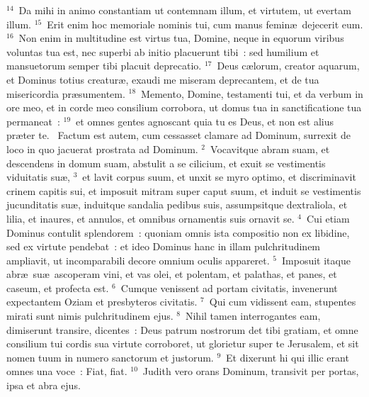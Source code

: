 ${}^{14}$~Da mihi in animo constantiam ut contemnam illum, et virtutem, ut evertam illum.
${}^{15}$~Erit enim hoc memoriale nominis tui, cum manus femin\ae\ dejecerit eum.
${}^{16}$~Non enim in multitudine est virtus tua, Domine, neque in equorum viribus voluntas tua est, nec superbi ab initio placuerunt tibi~: sed humilium et mansuetorum semper tibi placuit deprecatio.
${}^{17}$~Deus c\ae lorum, creator aquarum, et Dominus totius creatur\ae , exaudi me miseram deprecantem, et de tua misericordia pr\ae sumentem.
${}^{18}$~Memento, Domine, testamenti tui, et da verbum in ore meo, et in corde meo consilium corrobora, ut domus tua in sanctificatione tua permaneat~:
${}^{19}$~et omnes gentes agnoscant quia tu es Deus, et non est alius pr\ae ter te.
~Factum est autem, cum cessasset clamare ad Dominum, surrexit de loco in quo jacuerat prostrata ad Dominum.
${}^{2}$~Vocavitque abram suam, et descendens in domum suam, abstulit a se cilicium, et exuit se vestimentis viduitatis su\ae ,
${}^{3}$~et lavit corpus suum, et unxit se myro optimo, et discriminavit crinem capitis sui, et imposuit mitram super caput suum, et induit se vestimentis jucunditatis su\ae , induitque sandalia pedibus suis, assumpsitque dextraliola, et lilia, et inaures, et annulos, et omnibus ornamentis suis ornavit se.
${}^{4}$~Cui etiam Dominus contulit splendorem~: quoniam omnis ista compositio non ex libidine, sed ex virtute pendebat~: et ideo Dominus hanc in illam pulchritudinem ampliavit, ut incomparabili decore omnium oculis appareret.
${}^{5}$~Imposuit itaque abr\ae\ su\ae\ ascoperam vini, et vas olei, et polentam, et palathas, et panes, et caseum, et profecta est.
${}^{6}$~Cumque venissent ad portam civitatis, invenerunt expectantem Oziam et presbyteros civitatis.
${}^{7}$~Qui cum vidissent eam, stupentes mirati sunt nimis pulchritudinem ejus.
${}^{8}$~Nihil tamen interrogantes eam, dimiserunt transire, dicentes~: Deus patrum nostrorum det tibi gratiam, et omne consilium tui cordis sua virtute corroboret, ut glorietur super te Jerusalem, et sit nomen tuum in numero sanctorum et justorum.
${}^{9}$~Et dixerunt hi qui illic erant omnes una voce~: Fiat, fiat.
${}^{10}$~Judith vero orans Dominum, transivit per portas, ipsa et abra ejus.



